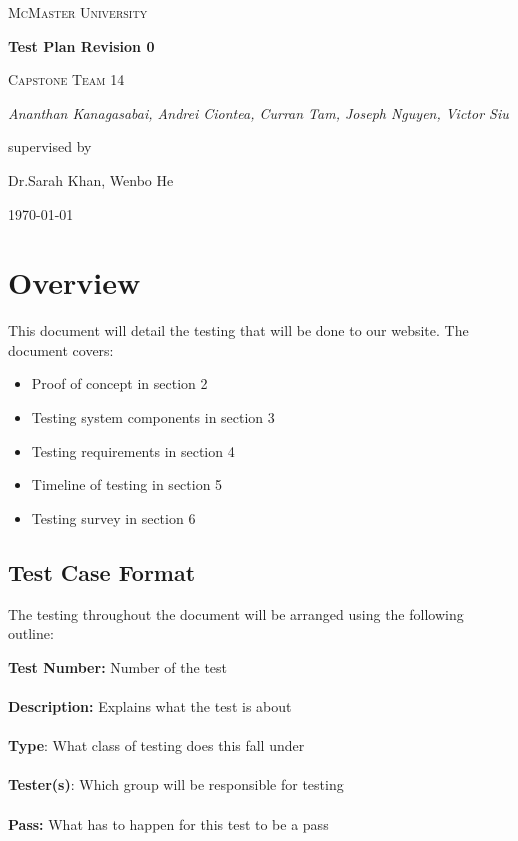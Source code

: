 \documentclass[12pt]{article}
\begin{document}
\begin{titlepage}
	\centering
	{\scshape\LARGE McMaster University \par}
	\vspace{1.5cm}
	{\huge\bfseries Test Plan Revision 0 \par}

	\vspace{1cm}
	{\scshape\Large Capstone Team 14\par}
	{\Large\itshape Ananthan Kanagasabai, Andrei Ciontea, Curran Tam, Joseph Nguyen, Victor Siu \par}
	\vspace{3cm}
	\vfill
	supervised by\par
	Dr.Sarah Khan, Wenbo He

	\vfill
	{\large \today\par}
\end{titlepage}

\newpage

\tableofcontents
\listoffigures
\listoftables
\newpage


\section{Overview}
This document will detail the testing that will be done to our website. The document covers:
\begin{itemize}
\item Proof of concept in section 2
\item Testing system components in section 3
\item Testing requirements in section 4
\item Timeline of testing in section 5
\item Testing survey in section 6
\end{itemize}

\subsection{Test Case Format}
The testing throughout the document will be arranged using the following outline:
\begin{tcolorbox}
\textbf{Test Number:} Number of the test \\ \\
\textbf{Description:} Explains what the test is about \\ \\
\textbf{Type}: What class of testing does this fall under \\ \\
\textbf{Tester(s)}: Which group will be responsible for testing \\ \\
\textbf{Pass:} What has to happen for this test to be a pass \\ \\
\end{tcolorbox}
\end{document}
